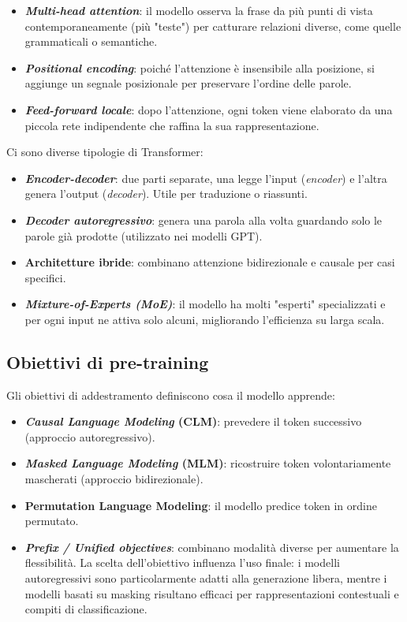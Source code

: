 \begin{itemize}
    \item \textbf{\textit{Multi-head attention}}: il modello osserva la frase da più punti di vista contemporaneamente (più "teste") per catturare relazioni diverse, come quelle grammaticali o semantiche.
    \item \textbf{\textit{Positional encoding}}: poiché l'attenzione è insensibile alla posizione, si aggiunge un segnale posizionale per preservare l'ordine delle parole.
    \item \textbf{\textit{Feed-forward locale}}: dopo l'attenzione, ogni token viene elaborato da una piccola rete indipendente che raffina la sua rappresentazione.
\end{itemize}

Ci sono diverse tipologie di Transformer:
\begin{itemize}
    \item \textbf{\textit{Encoder-decoder}}: due parti separate, una legge l'input (\textit{encoder}) e l'altra genera l'output (\textit{decoder}). Utile per traduzione o riassunti.
    \item \textbf{\textit{Decoder autoregressivo}}: genera una parola alla volta guardando solo le parole già prodotte (utilizzato nei modelli GPT).
    \item \textbf{Architetture ibride}: combinano attenzione bidirezionale e causale per casi specifici.
    \item \textbf{\textit{Mixture-of-Experts (MoE)}}: il modello ha molti "esperti" specializzati e per ogni input ne attiva solo alcuni, migliorando l'efficienza su larga scala.
\end{itemize}

\subsection{Obiettivi di pre-training}
Gli obiettivi di addestramento definiscono cosa il modello apprende:
\begin{itemize}
    \item \textbf{\textit{Causal Language Modeling} (CLM)}: prevedere il token successivo (approccio autoregressivo).
    \item \textbf{\textit{Masked Language Modeling} (MLM)}: ricostruire token volontariamente mascherati (approccio bidirezionale).
    \item \textbf{Permutation Language Modeling}: il modello predice token in ordine permutato.
    \item \textbf{\textit{Prefix / Unified objectives}}: combinano modalità diverse per aumentare la flessibilità. La scelta dell'obiettivo influenza l'uso finale: 
    i modelli autoregressivi sono particolarmente adatti alla generazione libera, mentre i modelli basati su masking risultano efficaci 
    per rappresentazioni contestuali e compiti di classificazione.
\end{itemize}

